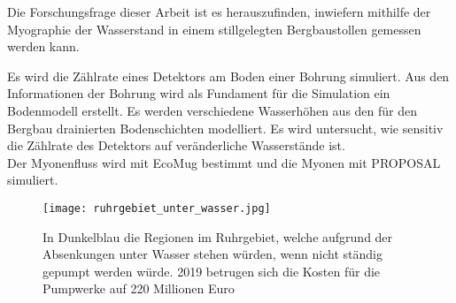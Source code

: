 Die Forschungsfrage dieser Arbeit ist es herauszufinden, inwiefern mithilfe der Myographie 
der Wasserstand in einem stillgelegten Bergbaustollen gemessen werden kann. 

Es wird die Zählrate eines Detektors am Boden einer Bohrung simuliert.
Aus den Informationen der Bohrung wird als Fundament für die Simulation 
ein Bodenmodell erstellt.
Es werden verschiedene Wasserhöhen aus den für den Bergbau drainierten Bodenschichten modelliert.
Es wird untersucht, wie sensitiv die Zählrate des Detektors auf veränderliche Wasserstände ist. 
\\
Der Myonenfluss wird mit EcoMug bestimmt und die Myonen mit PROPOSAL simuliert.

\begin{figure}[]
   \centering
   \texttt{[image: ruhrgebiet\_unter\_wasser.jpg]}
   \caption{In Dunkelblau die Regionen im Ruhrgebiet, welche aufgrund der Absenkungen 
   unter Wasser stehen würden, wenn nicht ständig gepumpt werden würde. 
   2019 betrugen sich die Kosten für die Pumpwerke auf 220 Millionen Euro\cite{waz_seen}}
   \label{fig:Ruhrgebiet_Seen}
\end{figure}


